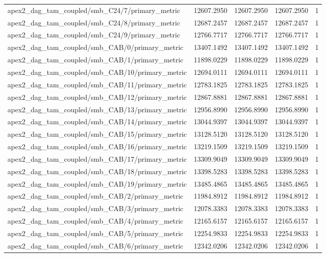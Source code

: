 \begin{table}[h]
\begin{tabular}{lrrrr}
apex2_dag_tam_coupled/smb_C24/7/primary_metric & 12607.2950 & 12607.2950 & 12607.2950 & 1 \\
apex2_dag_tam_coupled/smb_C24/8/primary_metric & 12687.2457 & 12687.2457 & 12687.2457 & 1 \\
apex2_dag_tam_coupled/smb_C24/9/primary_metric & 12766.7717 & 12766.7717 & 12766.7717 & 1 \\
apex2_dag_tam_coupled/smb_CAB/0/primary_metric & 13407.1492 & 13407.1492 & 13407.1492 & 1 \\
apex2_dag_tam_coupled/smb_CAB/1/primary_metric & 11898.0229 & 11898.0229 & 11898.0229 & 1 \\
apex2_dag_tam_coupled/smb_CAB/10/primary_metric & 12694.0111 & 12694.0111 & 12694.0111 & 1 \\
apex2_dag_tam_coupled/smb_CAB/11/primary_metric & 12783.1825 & 12783.1825 & 12783.1825 & 1 \\
apex2_dag_tam_coupled/smb_CAB/12/primary_metric & 12867.8881 & 12867.8881 & 12867.8881 & 1 \\
apex2_dag_tam_coupled/smb_CAB/13/primary_metric & 12956.8990 & 12956.8990 & 12956.8990 & 1 \\
apex2_dag_tam_coupled/smb_CAB/14/primary_metric & 13044.9397 & 13044.9397 & 13044.9397 & 1 \\
apex2_dag_tam_coupled/smb_CAB/15/primary_metric & 13128.5120 & 13128.5120 & 13128.5120 & 1 \\
apex2_dag_tam_coupled/smb_CAB/16/primary_metric & 13219.1509 & 13219.1509 & 13219.1509 & 1 \\
apex2_dag_tam_coupled/smb_CAB/17/primary_metric & 13309.9049 & 13309.9049 & 13309.9049 & 1 \\
apex2_dag_tam_coupled/smb_CAB/18/primary_metric & 13398.5283 & 13398.5283 & 13398.5283 & 1 \\
apex2_dag_tam_coupled/smb_CAB/19/primary_metric & 13485.4865 & 13485.4865 & 13485.4865 & 1 \\
apex2_dag_tam_coupled/smb_CAB/2/primary_metric & 11984.8912 & 11984.8912 & 11984.8912 & 1 \\
apex2_dag_tam_coupled/smb_CAB/3/primary_metric & 12078.3383 & 12078.3383 & 12078.3383 & 1 \\
apex2_dag_tam_coupled/smb_CAB/4/primary_metric & 12165.6157 & 12165.6157 & 12165.6157 & 1 \\
apex2_dag_tam_coupled/smb_CAB/5/primary_metric & 12254.9833 & 12254.9833 & 12254.9833 & 1 \\
apex2_dag_tam_coupled/smb_CAB/6/primary_metric & 12342.0206 & 12342.0206 & 12342.0206 & 1 \\

\end{tabular}
\end{table}
